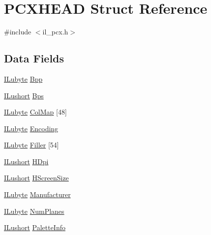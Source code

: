 \hypertarget{struct_p_c_x_h_e_a_d}{\section{P\-C\-X\-H\-E\-A\-D Struct Reference}
\label{struct_p_c_x_h_e_a_d}
}


{\ttfamily \#include $<$il\-\_\-pcx.\-h$>$}

\subsection*{Data Fields}
\begin{DoxyCompactItemize}
\item 
\hyperlink{il_8h_a8d2f04500100a86d1b00e98ab1b15a33}{I\-Lubyte} \hyperlink{struct_p_c_x_h_e_a_d_acb619433784a0e26c0f1f18b3700c9f7}{Bpp}
\item 
\hyperlink{il_8h_af6287b43748354a7c4864da43ae56962}{I\-Lushort} \hyperlink{struct_p_c_x_h_e_a_d_ae2dd397acb50561de43449bb5a821c6b}{Bps}
\item 
\hyperlink{il_8h_a8d2f04500100a86d1b00e98ab1b15a33}{I\-Lubyte} \hyperlink{struct_p_c_x_h_e_a_d_ac8fb105fe120691046611cd184216e47}{Col\-Map} \mbox{[}48\mbox{]}
\item 
\hyperlink{il_8h_a8d2f04500100a86d1b00e98ab1b15a33}{I\-Lubyte} \hyperlink{struct_p_c_x_h_e_a_d_a1b56e939de903a966230c1ee857413d5}{Encoding}
\item 
\hyperlink{il_8h_a8d2f04500100a86d1b00e98ab1b15a33}{I\-Lubyte} \hyperlink{struct_p_c_x_h_e_a_d_a5197893736337c3eba3e905a1a3b2a5b}{Filler} \mbox{[}54\mbox{]}
\item 
\hyperlink{il_8h_af6287b43748354a7c4864da43ae56962}{I\-Lushort} \hyperlink{struct_p_c_x_h_e_a_d_aca4eb1e4fd89f3665d1b8c76bd938932}{H\-Dpi}
\item 
\hyperlink{il_8h_af6287b43748354a7c4864da43ae56962}{I\-Lushort} \hyperlink{struct_p_c_x_h_e_a_d_a83464d22a2cd215689ec98bd2bf5ba4c}{H\-Screen\-Size}
\item 
\hyperlink{il_8h_a8d2f04500100a86d1b00e98ab1b15a33}{I\-Lubyte} \hyperlink{struct_p_c_x_h_e_a_d_a3b6d4abc3f4c8f441294ca13f670c5ea}{Manufacturer}
\item 
\hyperlink{il_8h_a8d2f04500100a86d1b00e98ab1b15a33}{I\-Lubyte} \hyperlink{struct_p_c_x_h_e_a_d_aae7ec9640632bcd0399af1026799dc7f}{Num\-Planes}
\item 
\hyperlink{il_8h_af6287b43748354a7c4864da43ae56962}{I\-Lushort} \hyperlink{struct_p_c_x_h_e_a_d_aa13262352c485f187f819a03b7eca3e9}{Palette\-Info}

\end{DoxyCompactItemize}
